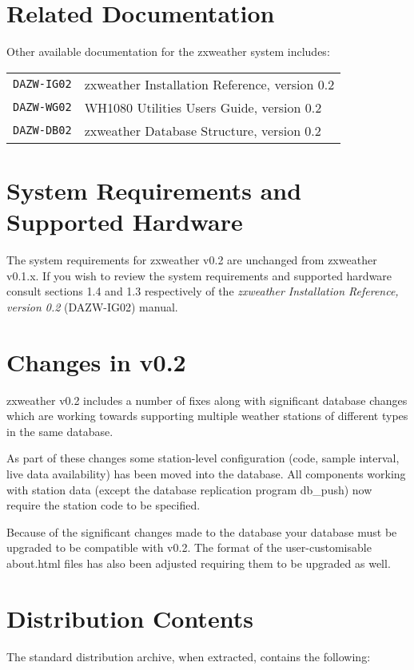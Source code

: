 \documentclass[a4paper,10pt,draft]{book}
\begin{document}
\section{Related Documentation}
Other available documentation for the zxweather system includes:

\begin{tabular}{l l}
\verb|DAZW-IG02| & zxweather Installation Reference, version 0.2\\
\verb|DAZW-WG02| & WH1080 Utilities Users Guide, version 0.2 \\
\verb|DAZW-DB02| & zxweather Database Structure, version 0.2 \\
\end{tabular}

\section{System Requirements and Supported Hardware}
The system requirements for zxweather v0.2 are unchanged from zxweather v0.1.x. If you wish to review the system requirements and supported hardware consult sections 1.4 and 1.3 respectively of the \emph{zxweather Installation Reference, version 0.2} (DAZW-IG02) manual.

\section{Changes in v0.2}
zxweather v0.2 includes a number of fixes along with significant database changes which are working towards supporting multiple weather stations of different types in the same database.

As part of these changes some station-level configuration (code, sample interval, live data availability) has been moved into the database. All components working with station data (except the database replication program db\_push) now require the station code to be specified.

Because of the significant changes made to the database your database must be upgraded to be compatible with v0.2. The format of the user-customisable about.html files has also been adjusted requiring them to be upgraded as well.

\section{Distribution Contents}
The standard distribution archive, when extracted, contains the following:
\end{document}
